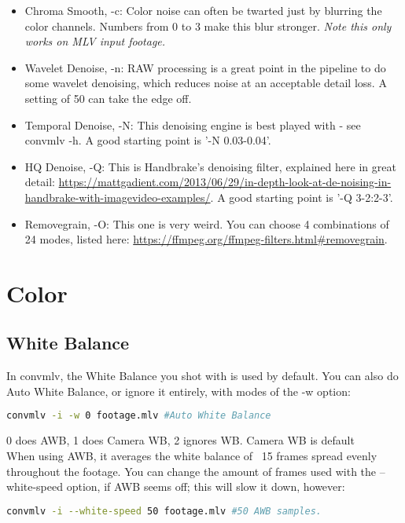 \documentclass[a4paper,12pt]{article}
\begin{document}
			\begin{itemize}
				\item Chroma Smooth, -c: Color noise can often be twarted just by blurring the color channels. Numbers from 0 to 3 make this blur
				stronger. \textit{Note this only works on MLV input footage.}
				\item Wavelet Denoise, -n: RAW processing is a great point in the pipeline to do some wavelet denoising, which reduces
				noise at an acceptable detail loss. A setting of 50 can take the edge off.
				\item Temporal Denoise, -N: This denoising engine is best played with - see convmlv -h. A good starting point is '-N 0.03-0.04'.
				\item HQ Denoise, -Q: This is Handbrake's denoising filter, explained here in great detail:
				\url{https://mattgadient.com/2013/06/29/in-depth-look-at-de-noising-in-handbrake-with-imagevideo-examples/}. A good starting
				point is '-Q 3-2:2-3'.
				\item Removegrain, -O: This one is very weird. You can choose 4 combinations of 24 modes, listed here:
				\url{https://ffmpeg.org/ffmpeg-filters.html#removegrain}.
			\end{itemize}
	
\section{Color}

	\subsection{White Balance}
		In convmlv, the White Balance you shot with is used by default. You can also do Auto White Balance, or ignore it entirely, with modes of the -w option:
	
\begin{lstlisting}[language=bash]
	convmlv -i -w 0 footage.mlv #Auto White Balance
\end{lstlisting}
	
		0 does AWB, 1 does Camera WB, 2 ignores WB. Camera WB is default\\
		
		When using AWB, it averages the white balance of ~15 frames spread evenly
		throughout the footage. You can change the amount of frames used with the --white-speed option, if AWB seems off; this
		will slow it down, however:
	
\begin{lstlisting}[language=bash]
	convmlv -i --white-speed 50 footage.mlv #50 AWB samples.
\end{lstlisting}
\end{document}
